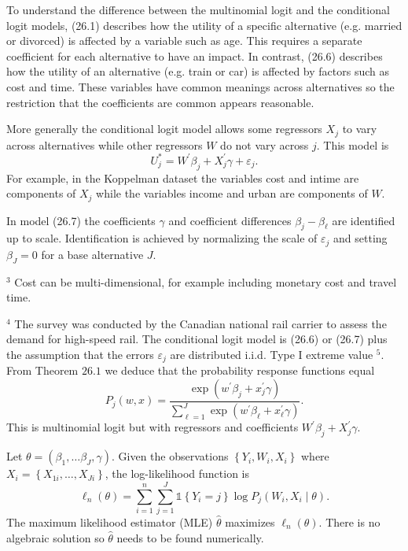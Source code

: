 \documentclass[10pt]{article}
\begin{document}
To understand the difference between the multinomial logit and the conditional logit models, (26.1) describes how the utility of a specific alternative (e.g. married or divorced) is affected by a variable such as age. This requires a separate coefficient for each alternative to have an impact. In contrast, (26.6) describes how the utility of an alternative (e.g. train or car) is affected by factors such as cost and time. These variables have common meanings across alternatives so the restriction that the coefficients are common appears reasonable.

More generally the conditional logit model allows some regressors $X_{j}$ to vary across alternatives while other regressors $W$ do not vary across $j$. This model is
$$
U_{j}^{*}=W^{\prime} \beta_{j}+X_{j}^{\prime} \gamma+\varepsilon_{j} .
$$
For example, in the Koppelman dataset the variables cost and intime are components of $X_{j}$ while the variables income and urban are components of $W$.

In model (26.7) the coefficients $\gamma$ and coefficient differences $\beta_{j}-\beta_{\ell}$ are identified up to scale. Identification is achieved by normalizing the scale of $\varepsilon_{j}$ and setting $\beta_{J}=0$ for a base alternative $J$.

${ }^{3}$ Cost can be multi-dimensional, for example including monetary cost and travel time.

${ }^{4}$ The survey was conducted by the Canadian national rail carrier to assess the demand for high-speed rail. The conditional logit model is (26.6) or (26.7) plus the assumption that the errors $\varepsilon_{j}$ are distributed i.i.d. Type I extreme value ${ }^{5}$. From Theorem $26.1$ we deduce that the probability response functions equal
$$
P_{j}(w, x)=\frac{\exp \left(w^{\prime} \beta_{j}+x_{j}^{\prime} \gamma\right)}{\sum_{\ell=1}^{J} \exp \left(w^{\prime} \beta_{\ell}+x_{\ell}^{\prime} \gamma\right)} .
$$
This is multinomial logit but with regressors and coefficients $W^{\prime} \beta_{j}+X_{j}^{\prime} \gamma$.

Let $\theta=\left(\beta_{1}, \ldots \beta_{J}, \gamma\right)$. Given the observations $\left\{Y_{i}, W_{i}, X_{i}\right\}$ where $X_{i}=\left\{X_{1 i}, \ldots, X_{J i}\right\}$, the log-likelihood function is
$$
\ell_{n}(\theta)=\sum_{i=1}^{n} \sum_{j=1}^{J} \mathbb{1}\left\{Y_{i}=j\right\} \log P_{j}\left(W_{i}, X_{i} \mid \theta\right) .
$$
The maximum likelihood estimator (MLE) $\widehat{\theta}$ maximizes $\ell_{n}(\theta)$. There is no algebraic solution so $\widehat{\theta}$ needs to be found numerically.
\end{document}
